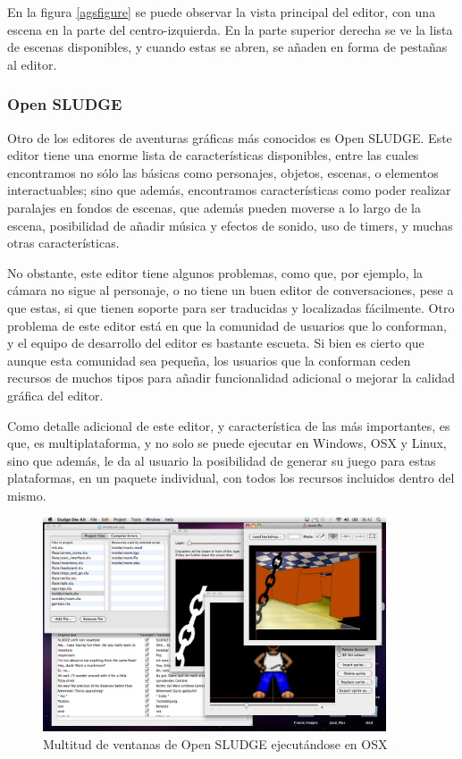 En la figura \ref{agsfigure} se puede observar la vista principal del editor, con una escena en la parte del centro-izquierda. En la parte superior derecha se ve la lista de escenas disponibles, y cuando estas se abren, se añaden en forma de pestañas al editor.

\subsubsection{Open SLUDGE}
\label{opensludge}

Otro de los editores de aventuras gráficas más conocidos es Open SLUDGE. Este editor tiene una enorme lista de características disponibles, entre las cuales encontramos no sólo las básicas como personajes, objetos, escenas, o elementos interactuables; sino que además, encontramos características como poder realizar paralajes en fondos de escenas, que además pueden moverse a lo largo de la escena, posibilidad de añadir música y efectos de sonido, uso de timers, y muchas otras características.

No obstante, este editor tiene algunos problemas, como que, por ejemplo, la cámara no sigue al personaje, o no tiene un buen editor de conversaciones, pese a que estas, si que tienen soporte para ser traducidas y localizadas fácilmente. Otro problema de este editor está en que la comunidad de usuarios que lo conforman, y el equipo de desarrollo del editor es bastante escueta. Si bien es cierto que aunque esta comunidad sea pequeña, los usuarios que la conforman ceden recursos de muchos tipos para añadir funcionalidad adicional o mejorar la calidad gráfica del editor.

Como detalle adicional de este editor, y característica de las más importantes, es que, es multiplataforma, y no solo se puede ejecutar en Windows, OSX y Linux, sino que además, le da al usuario la posibilidad de generar su juego para estas plataformas, en un paquete individual, con todos los recursos incluidos dentro del mismo.

\begin{figure}[htb]
	\includegraphics[height=2.5in]{figures/sludge.png}
	\caption[Open SLUDGE]{Multitud de ventanas de Open SLUDGE ejecutándose en OSX}
	\label{sludgefigure}
\end{figure}

